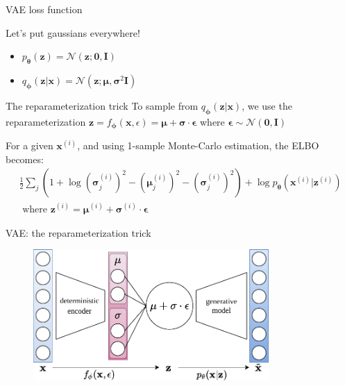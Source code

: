 \documentclass{beamer}
\begin{document}
  \begin{frame}{VAE loss function}

  
    Let's put gaussians everywhere!
    \begin{itemize}
      \item $p_{\boldsymbol{\theta}}(\mathbf{z}) = \mathcal{N}(\mathbf{z}; \mathbf{0}, \mathbf{I})$
      \item $q_{\boldsymbol{\phi}}(\mathbf{z}|\mathbf{x}) = \mathcal{N}(\mathbf{z}; \boldsymbol{\mu}, \boldsymbol{\sigma}^2\mathbf{I})$
    \end{itemize}

    \begin{block}{The reparameterization trick}
      To sample from $q_{\boldsymbol{\phi}}(\mathbf{z}|\mathbf{x})$, we use the reparameterization $\mathbf{z} = f_{\boldsymbol{\phi}}(\mathbf{x}, \epsilon) = \boldsymbol{\mu} + \boldsymbol{\sigma} \cdot \boldsymbol{\epsilon}$ where $\boldsymbol{\epsilon} \sim \mathcal{N}(\mathbf{0}, \mathbf{I})$
    \end{block}

    \small{For a given $\mathbf{x}^{(i)}$, and using 1-sample Monte-Carlo estimation, the ELBO becomes:}
    \vspace{0cm}
    \begin{multline*}
      \frac{1}{2} \sum_j \left(1 + \log (\boldsymbol{\sigma}^{(i)}_j)^2 - (\boldsymbol{\mu}^{(i)}_j)^2 - (\boldsymbol{\sigma}^{(i)}_j)^2 \right) + \log p_{\boldsymbol{\theta}}(\mathbf{x}^{(i)}|\mathbf{z}^{(i)})\\
      \text{ where } \mathbf{z}^{(i)} = \boldsymbol{\mu}^{(i)} + \boldsymbol{\sigma}^{(i)} \cdot \boldsymbol{\epsilon}
    \end{multline*}

  \end{frame}

  \begin{frame}{VAE: the reparameterization trick}

    \begin{figure}
      \includegraphics[width=9cm]{rc/vae-reparameterization}
    \end{figure}
    
  \end{frame}
\end{document}
